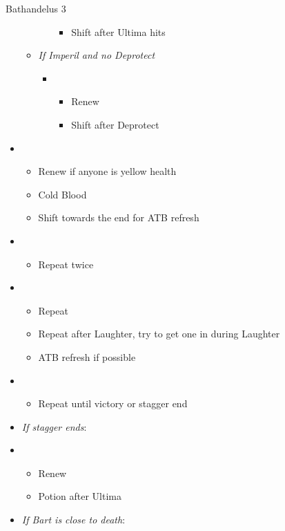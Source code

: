 \documentclass{report}
\begin{document}
\begin{battle}{Bathandelus 3}
\begin{multicols}{2}
\begin{itemize}
\begin{itemize}
\begin{itemize}
\begin{itemize}
                \item Shift after Ultima hits
            \end{itemize}
        \end{itemize}
        \item \textit{If Imperil and no Deprotect}
        \begin{itemize}
            \item \fifth
            \begin{itemize}
                \item Renew
                \item Shift after Deprotect
            \end{itemize}
        \end{itemize}
    \end{itemize}
    \item \sixth
    \begin{itemize}
        \item Renew if anyone is yellow health
        \item Cold Blood
        \item Shift towards the end for ATB refresh
    \end{itemize}
    \item \second
    \begin{itemize}
        \item Repeat twice
    \end{itemize}
    \item \first
    \begin{itemize}
        \item Repeat
        \item Repeat after Laughter, try to get one in during Laughter
        \item ATB refresh if possible
    \end{itemize}
    \item \second
    \begin{itemize}
        \item Repeat until victory or stagger end
    \end{itemize}
    \columnbreak
    \item \textit{If stagger ends}:
    \item \third
    \begin{itemize}
        \item Renew
        \item Potion after Ultima
    \end{itemize}
    \item \textit{If Bart is close to death}:

\end{itemize}
\end{multicols}
\end{battle}
\end{document}
